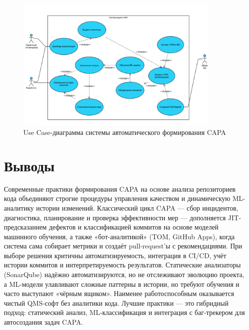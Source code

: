 \begin{figure}[ht]
	\centering
	\includegraphics[width=0.9\textwidth]{my_folder/images/useCase (1).png}
	\caption{Use Case-диаграмма системы автоматического формирования CAPA}
	\label{fig:usecase}
\end{figure}


\section{Выводы} \label{ch1:conclusion}

Современные практики формирования CAPA на основе анализа репозиториев кода объединяют строгие процедуры управления качеством и динамическую ML-аналитику истории изменений. Классический цикл CAPA — сбор инцидентов, диагностика, планирование и проверка эффективности мер — дополняется JIT-предсказанием дефектов и классификацией коммитов на основе моделей машинного обучения, а также «бот-аналитикой» (TOM, GitHub Apps), когда система сама собирает метрики и создаёт pull-request’ы с рекомендациями. При выборе решения критичны автоматизируемость, интеграция в CI/CD, учёт истории коммитов и интерпретируемость результатов. Статические анализаторы (SonarQube) надёжно автоматизируются, но не отслеживают эволюцию проекта, а ML-модели улавливают сложные паттерны в истории, но требуют обучения и часто выступают «чёрным ящиком». Наименее работоспособным оказывается чистый QMS-софт без аналитики кода. Лучшие практики — это гибридный подход: статический анализ, ML-классификация и интеграция с баг-трекером для автосоздания задач CAPA.


